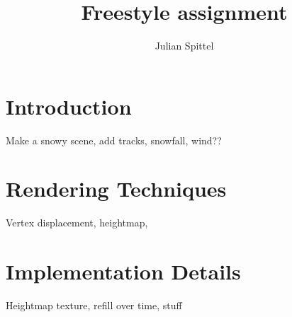 \documentclass[paper=a4]{article}
\author{Julian Spittel}
\begin{document}
	\title{Freestyle assignment}
	\maketitle
	\tableofcontents
	\newpage
	\section{Introduction}
	
	 Make a snowy scene, add tracks, snowfall, wind??
	
	\section{Rendering Techniques}
	
	Vertex displacement, heightmap, 
	
	\section{Implementation Details}
	Heightmap texture, refill over time, stuff
	
\end{document}

